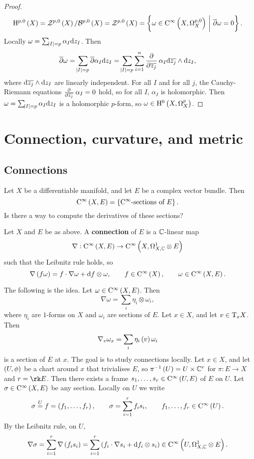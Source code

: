 \begin{proof}
$$ \H^{p, 0}\br{X} = \ZZZ^{p, 0}\br{X} / \BBB^{p, 0}\br{X} = \ZZZ^{p, 0}\br{X} = \cbr{\omega \in \C^\infty\br{X, \Omega_X^{p, 0}} \st \overline{\partial}\omega = 0}. $$
Locally $ \omega = \sum_{\abs{I} = p} \alpha_I\mathrm{d} z_I $. Then
$$ \overline{\partial}\omega = \sum_{\abs{I} = p} \overline{\partial}\alpha_I\d z_I = \sum_{\abs{I} = p} \sum_{i = 1}^n \dpd{}{\overline{z_j}}\alpha_I\d\overline{z_j} \wedge \d z_I, $$
where $ \mathrm{d}\overline{z_j} \wedge \mathrm{d} z_I $ are linearly independent. For all $ I $ and for all $ j $, the Cauchy-Riemann equations $ \tpd{}{\overline{z_j}}\alpha_I = 0 $ hold, so for all $ I $, $ \alpha_I $ is holomorphic. Then $ \omega = \sum_{\abs{I} = p} \alpha_I\mathrm{d} z_I $ is a holomorphic $ p $-form, so $ \omega \in \H^0\br{X, \Omega_X^p} $.
\end{proof}

\pagebreak

\section{Connection, curvature, and metric}

\subsection{Connections}

Let $ X $ be a differentiable manifold, and let $ E $ be a complex vector bundle. Then
$$ \C^\infty\br{X, E} = \cbr{\text{$ \C^\infty $-sections of} \ E}. $$
Is there a way to compute the derivatives of these sections?

\begin{definition}
Let $ X $ and $ E $ be as above. A \textbf{connection} of $ E $ is a $ \mathbb{C} $-linear map
$$ \nabla : \C^\infty\br{X, E} \to \C^\infty\br{X, \Omega_{X, \CC}^1 \otimes E} $$
such that the Leibnitz rule holds, so
$$ \nabla\br{f\omega} = f \cdot \nabla\omega + \d f \otimes \omega, \qquad f \in \C^\infty\br{X}, \qquad \omega \in \C^\infty\br{X, E}. $$
\end{definition}

The following is the idea. Let $ \omega \in \C^\infty\br{X, E} $. Then
$$ \nabla\omega = \sum_i \eta_i \otimes \omega_i, $$
where $ \eta_i $ are $ 1 $-forms on $ X $ and $ \omega_i $ are sections of $ E $. Let $ x \in X $, and let $ v \in \mathrm{T}_xX $. Then
$$ \nabla_v\omega_x = \sum_i \eta_i\br{v}\omega_i $$
is a section of $ E $ at $ x $. The goal is to study connections locally. Let $ x \in X $, and let $ \br{U, \phi} $ be a chart around $ x $ that trivialises $ E $, so $ \pi^{-1}\br{U} = U \times \CC^r $ for $ \pi : E \to X $ and $ r = \rk E $. Then there exists a frame $ s_1, \dots, s_r \in \C^\infty\br{U, E} $ of $ E $ on $ U $. Let $ \sigma \in \C^\infty\br{X, E} $ be any section. Locally on $ U $ we write
$$ \sigma \overset{U}{=} f = \br{f_1, \dots, f_r}, \qquad \sigma = \sum_{i = 1}^r f_is_i, \qquad f_1, \dots, f_r \in \C^\infty\br{U}. $$
By the Leibnitz rule, on $ U $,
$$ \nabla\sigma = \sum_{i = 1}^r \nabla\br{f_is_i} = \sum_{i = 1}^r \br{f_i \cdot \nabla s_i + \d f_i \otimes s_i} \in \C^\infty\br{U, \Omega_{X, \CC}^1 \otimes E}. $$

